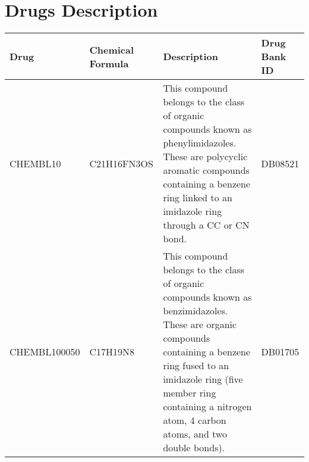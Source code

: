 \begin{landscape}
\begin{table}[H]
\begin{longtable}{|p{1.5cm}|p{3.7cm}|p{18cm}|}
        
        \end{longtable}
    
\end{table}

\section{Drugs Description}

\begin{table}[H]
    \centering
    \caption{Description of Drug Compounds.}
    \begin{longtable}{|p{1.5cm}|p{3.7cm}|p{7cm}|p{1.5cm}|}
    \hline
    
    Drug & Chemical Formula & Description  & Drug Bank ID \\ \hline
    CHEMBL10 & C21H16FN3OS & This compound belongs to the class of organic compounds known as phenylimidazoles. These are polycyclic aromatic compounds containing a benzene ring linked to an imidazole ring through a CC or CN bond. & DB08521 \\ \hline
    CHEMBL100050 & C17H19N8 & This compound belongs to the class of organic compounds known as benzimidazoles. These are organic compounds containing a benzene ring fused to an imidazole ring (five member ring containing a nitrogen atom, 4 carbon atoms, and two double bonds). & DB01705 \\ \hline
    
    \end{longtable}
\end{table}

\end{landscape}